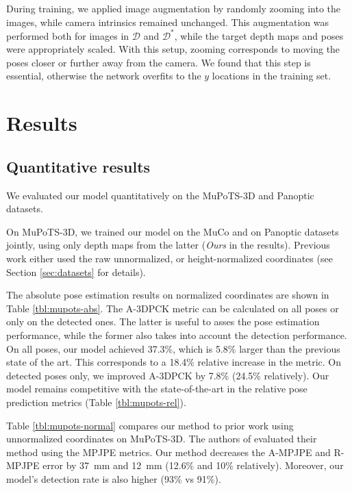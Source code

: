 \documentclass[runningheads]{llncs}
\begin{document}
During training, we applied image augmentation by randomly zooming into the images, while camera intrinsics remained unchanged. This augmentation was performed both for images in $\mathcal{D}$ and $\mathcal{D}^*$, while the target depth maps and poses were appropriately scaled. With this setup, zooming corresponds to moving the poses closer or further away from the camera. We found that this step is essential, otherwise the network overfits to the $y$ locations in the training set.

\section{Results}
\subsection{Quantitative results}

We evaluated our model quantitatively on the MuPoTS-3D and Panoptic datasets. 

On MuPoTS-3D, we trained our model on the MuCo and on Panoptic datasets jointly, using only depth maps from the latter (\emph{Ours} in the results). Previous work either used the raw unnormalized, or height-normalized coordinates (see Section \ref{sec:datasets} for details). 

The absolute pose estimation results on normalized coordinates are shown in Table \ref{tbl:mupots-abs}. The A\nobreakdash-3DPCK metric can be calculated on all poses or only on the detected ones. The latter is useful to asses the pose estimation performance, while the former also takes into account the detection performance. On all poses, our model achieved 37.3\%, which is 5.8\% larger than the previous state of the art. This corresponds to a 18.4\% relative increase in the metric. On detected poses only, we improved  A\nobreakdash-3DPCK by 7.8\% (24.5\% relatively). Our model remains competitive with the state-of-the-art in the relative pose prediction metrics (Table \ref{tbl:mupots-rel}).

Table \ref{tbl:mupots-normal} compares our method to prior work using unnormalized coordinates on MuPoTS-3D. The authors of \cite{veges2019depthpose} evaluated their method using the MPJPE metrics. Our method decreases the A-MPJPE and R-MPJPE error by 37~mm and 12~mm (12.6\% and 10\% relatively). Moreover, our model's detection rate is also higher (93\% vs 91\%).
\end{document}

